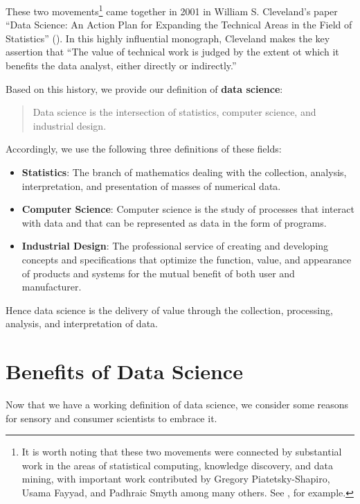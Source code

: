 \documentclass[
]{book}
\providecommand{\tightlist}{%
  \setlength{\itemsep}{0pt}\setlength{\parskip}{0pt}}
\begin{document}
These two movements\footnote{It is worth noting that these two movements were connected by substantial work in the areas of statistical computing, knowledge discovery, and data mining, with important work contributed by Gregory Piatetsky-Shapiro, Usama Fayyad, and Padhraic Smyth among many others. See \citet{Fayyad1996}, for example.} came together in 2001 in William S. Cleveland's paper ``Data Science: An Action Plan for Expanding the Technical Areas in the Field of Statistics'' (\citet{Cleveland2001}). In this highly influential monograph, Cleveland makes the key assertion that ``The value of technical work is judged by the extent ot which it benefits the data analyst, either directly or indirectly.''

Based on this history, we provide our definition of \textbf{data science}:

\begin{quote}
Data science is the intersection of statistics, computer science, and industrial design.
\end{quote}

Accordingly, we use the following three definitions of these fields:

\begin{itemize}
\tightlist
\item
  \textbf{Statistics}: The branch of mathematics dealing with the collection, analysis, interpretation, and presentation of masses of numerical data.
\item
  \textbf{Computer Science}: Computer science is the study of processes that interact with data and that can be represented as data in the form of programs.
\item
  \textbf{Industrial Design}: The professional service of creating and developing concepts and specifications that optimize the function, value, and appearance of products and systems for the mutual benefit of both user and manufacturer.
\end{itemize}

Hence data science is the delivery of value through the collection, processing, analysis, and interpretation of data.

\hypertarget{benefits-of-data-science}{%
\section{Benefits of Data Science}\label{benefits-of-data-science}}

Now that we have a working definition of data science, we consider some reasons for sensory and consumer scientists to embrace it.
\end{document}
